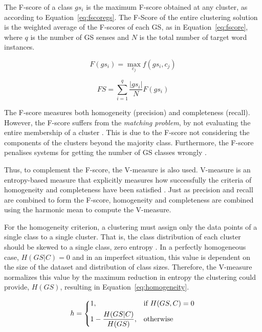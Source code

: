 The F-score of a class $gs_i$ is the maximum F-score obtained at any cluster, as
according to Equation~\ref{eq:fscoregs}. The F-Score of the entire clustering
solution is the weighted average of the F-scores of each \ac{GS}, as in
Equation~\ref{eq:fscore}, where $q$ is the number of \ac{GS} senses and $N$ is
the total number of target word instances.

\begin{equation} \label{eq:fscoregs}
 F(gs_i) = \underset{c_j}{\max} f(gs_i, c_j)
\end{equation}

\begin{equation} \label{eq:fscore}
 FS = \sum_{i=1}^q \frac{|gs_i|}{N}F(gs_i)
\end{equation}

The F-score measures both homogeneity (precision) and completeness (recall).
However, the F-score suffers from the \textit{matching problem}, by not
evaluating the entire membership of a cluster \cite{rosenberg2007v}. This is
due to the F-score not considering the components of the clusters beyond the
majority class. Furthermore, the F-score penalises systems for getting the
number of \ac{GS} classes wrongly \cite{manandhar2009semeval}.

Thus, to complement the F-score, the V-measure is also used. V-measure is an
entropy-based measure that explicitly measures how successfully the criteria
of homogeneity and completeness have been satisfied \cite{rosenberg2007v}. Just
as precision and recall are combined to form the F-score, homogeneity and
completeness are combined using the harmonic mean to compute the V-measure.

For the homogeneity criterion, a clustering must assign only the data points of a
single class to a single cluster. That is, the class distribution of each
cluster should be skewed to a single class, zero entropy \cite{rosenberg2007v}.
In a perfectly homogeneous case, $H(GS|C) = 0$ and in an imperfect situation,
this value is dependent on the size of the dataset and distribution of class
sizes. Therefore, the V-measure normalizes this value by the maximum reduction
in entropy the clustering could provide, $H(GS)$, resulting in
Equation~\ref{eq:homogeneity}.

\begin{equation} \label{eq:homogeneity}
 h = \begin{dcases}
      1,                        & \text{if } H(GS,C) = 0 \\
      1 - \frac{H(GS|C)}{H(GS)},& \text{otherwise} \\
     \end{dcases}
\end{equation}

